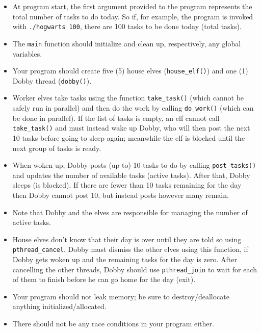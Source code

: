 \documentclass[a4paper]{report}
\begin{document}
\begin{itemize}
	\item At program start, the first argument provided to the program represents the total number of tasks to do today. So if, for example, the program is invoked with \texttt{./hogwarts 100}, there are 100 tasks to be done today (total tasks).

	\item The \texttt{main} function should initialize and clean up, respectively, any global variables.

	\item Your program should create five (5) house elves (\texttt{house\_elf()}) and one (1) Dobby thread (\texttt{dobby()}).

	\item Worker elves take tasks using the function
	      \texttt{take\_task()} (which cannot be safely run in parallel) and then do the work by
	      calling \texttt{do\_work()} (which can be done in parallel). If the list of tasks is
	      empty, an elf cannot call \texttt{take\_task()} and must instead wake up Dobby, who will then post the next 10 tasks before going to sleep again; meanwhile the elf is blocked until the next group of tasks is ready.

	\item When woken up, Dobby posts (up to) 10 tasks to do by calling \texttt{post\_tasks()} and updates the number of available tasks (active tasks). After that, Dobby sleeps (is blocked). If there are fewer than 10 tasks remaining for the day then Dobby cannot post 10, but instead posts however many remain.

	\item  Note that Dobby and the elves are responsible for managing the number of active tasks.

	\item House elves don't know that their day is over until they are told so using \texttt{pthread\_cancel}. Dobby must dismiss the other elves using this function, if Dobby gets woken up and the remaining tasks for the day is zero. After cancelling the other threads, Dobby should use \texttt{pthread\_join} to wait for each of them to finish before he can go home for the day (exit).

	\item Your program should not leak memory; be sure to destroy/deallocate anything initialized/allocated.

	\item There should not be any race conditions in your program either.
\end{itemize}
\end{document}

